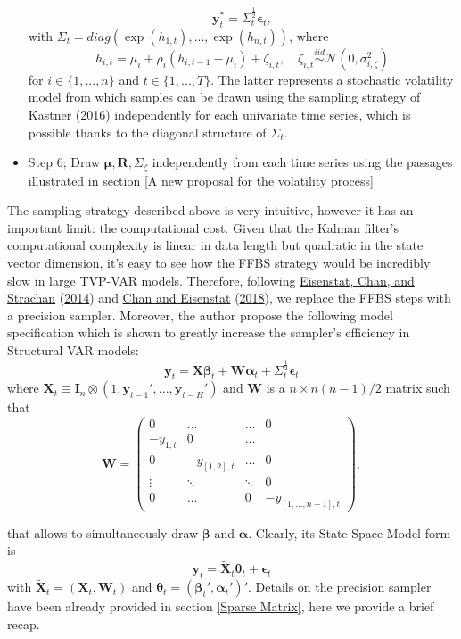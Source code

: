 \documentclass[
  12pt,
]{book}
\theoremstyle{break}
\theoremstyle{nonumberplain}
\begin{document}
\begin{itemize}
\[
\boldsymbol{y}^{*}_{t}=\Sigma_{t}^{\frac{1}{2}}\boldsymbol{\epsilon}_{t},
\]
with $\Sigma_{t}=diag(\exp(h_{1,t}),...,\exp(h_{n,t}))$, where
\[
h_{i,t} = \mu_i+\rho_i(h_{i,t-1}-\mu_i)+\zeta_{i,t}, \quad \zeta_{i,t}\overset{iid}{\sim}\mathcal{N}(0,\sigma^{2}_{i,\zeta})
\]
for $i \in \{1,...,n\}$ and $t \in \{1,...,T\}$. The latter represents a stochastic volatility model from which samples can be drawn using the sampling strategy of Kastner (2016) independently for each univariate time series, which is possible thanks to the diagonal structure of $\Sigma_{t}$.
\item Step 6; Draw $\boldsymbol{\mu},\boldsymbol{R},\Sigma_{\zeta}$ independently from each time series using the passages illustrated in section \ref{A new proposal for the volatility process}
\end{itemize}

The sampling strategy described above is very intuitive, however it has
an important limit: the computational cost. Given that the Kalman
filter's computational complexity is linear in data length but quadratic
in the state vector dimension, it's easy to see how the FFBS strategy
would be incredibly slow in large TVP-VAR models. Therefore, following
\protect\hyperlink{ref-EJC_2016}{Eisenstat, Chan, and Strachan}
(\protect\hyperlink{ref-EJC_2016}{2014}) and
\protect\hyperlink{ref-Chan_2018}{Chan and Eisenstat}
(\protect\hyperlink{ref-Chan_2018}{2018}), we replace the FFBS steps
with a precision sampler. Moreover, the author propose the following
model specification which is shown to greatly increase the sampler's
efficiency in Structural VAR models: \[
\boldsymbol{y}_t = \boldsymbol{X}\boldsymbol{\beta}_{t}+\boldsymbol{W}\boldsymbol{\alpha}_{t}+\Sigma_{t}^{\frac{1}{2}}\boldsymbol{\epsilon}_{t}
\] where
\(\boldsymbol{X}_{t}\equiv\boldsymbol{I}_{n}\otimes (1,\boldsymbol{y}_{t-1}',...,\boldsymbol{y}_{t-H}')\)
and \(\boldsymbol{W}\) is a \(n\times n(n-1)/2\) matrix such that \[
\boldsymbol{W}=\begin{pmatrix}
  0 & ... &  ... & 0 \\
  -y_{1,t} & 0 & ... \\
  0 & -y_{[1,2],t} & ... & 0 \\
  \vdots & \ddots & \ddots & 0\\
  0 & \dots &  0 & -y_{[1,...,n-1],t}
  \end{pmatrix},
\]

that allows to simultaneously draw \(\boldsymbol{\beta}\) and
\(\boldsymbol{\alpha}\). Clearly, its State Space Model form is \[
\boldsymbol{y}_{t} = \tilde{\boldsymbol{X}}_t\boldsymbol{\theta}_t+\boldsymbol{\epsilon}_t
\] with \(\tilde{\boldsymbol{X}}_t=(\boldsymbol{X}_t,\boldsymbol{W}_t)\)
and
\(\boldsymbol{\theta}_t=(\boldsymbol{\beta}_t',\boldsymbol{\alpha}_t')'\).
Details on the precision sampler have been already provided in section
\ref{Sparse Matrix}, here we provide a brief recap.
\end{document}
